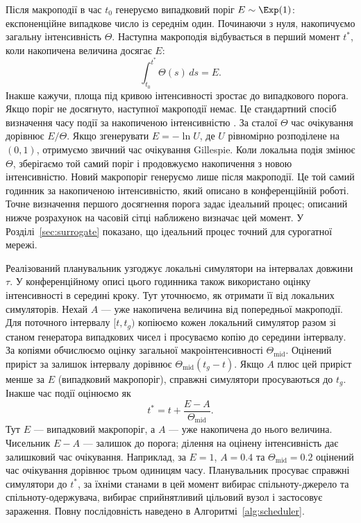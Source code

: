 Після макроподії в час $t_0$ генеруємо випадковий поріг $E\sim\Exp(1)$: експоненційне випадкове число із середнім один. Починаючи з нуля, накопичуємо загальну інтенсивність $\Theta$. Наступна макроподія відбувається в перший момент $t^\ast$, коли накопичена величина досягає $E$:
\begin{equation}
\label{eq:hazard_integral}
\int_{t_0}^{t^\ast}\Theta(s)\,ds=E.
\end{equation}
Інакше кажучи, площа під кривою інтенсивності зростає до випадкового порога. Якщо поріг не досягнуто, наступної макроподії немає. Це стандартний спосіб визначення часу події за накопиченою інтенсивністю \citep{ethier1986,anderson2007}. За сталої $\Theta$ час очікування дорівнює $E/\Theta$. Якщо згенерувати $E=-\ln U$, де $U$ рівномірно розподілене на $(0,1)$, отримуємо звичний час очікування Gillespie. Коли локальна подія змінює $\Theta$, зберігаємо той самий поріг і продовжуємо накопичення з новою інтенсивністю. Новий макропоріг генеруємо лише після макроподії. Це той самий годинник за накопиченою інтенсивністю, який описано в конференційній роботі. Точне визначення першого досягнення порога задає ідеальний процес; описаний нижче розрахунок на часовій сітці наближено визначає цей момент. У Розділі~\ref{sec:surrogate} показано, що ідеальний процес точний для сурогатної мережі.

Реалізований планувальник узгоджує локальні симулятори на інтервалах довжини $\tau$. У конференційному описі цього годинника також використано оцінку інтенсивності в середині кроку. Тут уточнюємо, як отримати її від локальних симуляторів. Нехай $A$ --- уже накопичена величина від попередньої макроподії. Для поточного інтервалу $[t,t_g)$ копіюємо кожен локальний симулятор разом зі станом генератора випадкових чисел і просуваємо копію до середини інтервалу. За копіями обчислюємо оцінку загальної макроінтенсивності $\Theta_{\mathrm{mid}}$. Оцінений приріст за залишок інтервалу дорівнює $\Theta_{\mathrm{mid}}(t_g-t)$. Якщо $A$ плюс цей приріст менше за $E$ (випадковий макропоріг), справжні симулятори просуваються до $t_g$. Інакше час події оцінюємо як
\begin{equation}
\label{eq:interpolation}
t^\ast=t+\frac{E-A}{\Theta_{\mathrm{mid}}}.
\end{equation}
Тут $E$ --- випадковий макропоріг, а $A$ --- уже накопичена до нього величина. Чисельник $E-A$ --- залишок до порога; ділення на оцінену інтенсивність дає залишковий час очікування. Наприклад, за $E=1$, $A=0.4$ та $\Theta_{\mathrm{mid}}=0.2$ оцінений час очікування дорівнює трьом одиницям часу. Планувальник просуває справжні симулятори до $t^\ast$, за їхніми станами в цей момент вибирає спільноту-джерело та спільноту-одержувача, вибирає сприйнятливий цільовий вузол і застосовує зараження. Повну послідовність наведено в Алгоритмі~\ref{alg:scheduler}.

